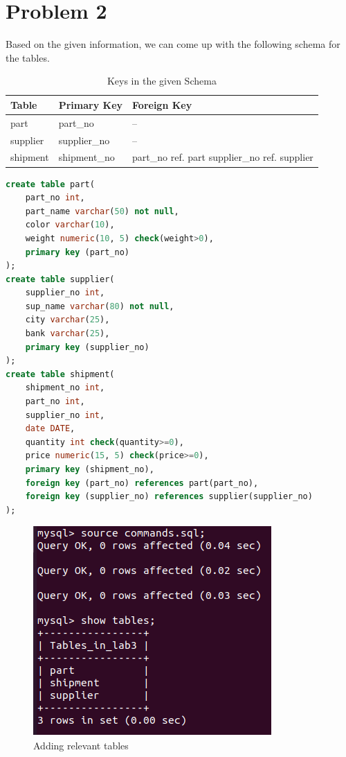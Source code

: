 \documentclass{article}
\begin{document}
\section{Problem 2}
Based on the given information, we can come up with the following schema for the tables.
\begin{table}[ht]
  \centering
  \begin{center}
  \begin{tabular}{||C{3cm}||C{3cm}||C{3cm}||}
  \hline  
  \hline
  \textbf{Table} & \textbf{Primary Key}  & \textbf{Foreign Key}\\
  \hline \hline

  part & part\_no  & -- \\
  \hline \hline

  supplier & supplier\_no  & -- \\
  \hline \hline

  shipment & shipment\_no  & part\_no ref. part supplier\_no ref. supplier \\
  \hline \hline

  \end{tabular}
\end{center}
\caption{Keys in the given Schema}
\end{table}
\begin{lstlisting}[language=sql]
create table part(
    part_no int,
    part_name varchar(50) not null,
    color varchar(10),
    weight numeric(10, 5) check(weight>0),
    primary key (part_no)
);
create table supplier(
    supplier_no int,
    sup_name varchar(80) not null,
    city varchar(25),
    bank varchar(25),
    primary key (supplier_no)
);
create table shipment(
    shipment_no int,
    part_no int,
    supplier_no int,
    date DATE,
    quantity int check(quantity>=0),
    price numeric(15, 5) check(price>=0),
    primary key (shipment_no),
    foreign key (part_no) references part(part_no),
    foreign key (supplier_no) references supplier(supplier_no)
);
\end{lstlisting}
\begin{figure}[!ht]
  \begin{center}
  \includegraphics[scale=0.65]{add_tables.png}
  \caption{Adding relevant tables}
  \end{center}
\end{figure}
\end{document}
